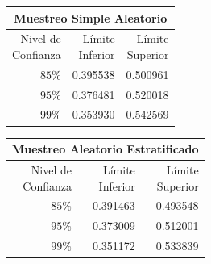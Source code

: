 \documentclass[12pt,a4paper]{article}
\begin{document}
{{            \begin{minipage}{0.5\textwidth}
                \centering
                \begin{tabular}{r|rr}
                    \multicolumn{3}{c}{Muestreo Simple Aleatorio} \\
                \midrule
                    \makecell{Nivel de\\Confianza} & \makecell{Límite\\Inferior} & \makecell{Límite\\Superior} \\
                \midrule
                    $85\%$ & 0.395538 & 0.500961 \\
                    $95\%$ & 0.376481 & 0.520018 \\
                    $99\%$ & 0.353930 & 0.542569 \\
                \bottomrule
                \end{tabular}
            \end{minipage}%
            \begin{minipage}{0.5\textwidth}
                \centering
                \begin{tabular}{r|rr}
                    \multicolumn{3}{c}{Muestreo Aleatorio Estratificado} \\
                \midrule
                    \makecell{Nivel de\\Confianza} & \makecell{Límite\\Inferior} & \makecell{Límite\\Superior} \\
                \midrule
                    $85\%$ & 0.391463 & 0.493548 \\
                    $95\%$ & 0.373009 & 0.512001 \\
                    $99\%$ & 0.351172 & 0.533839 \\
                \bottomrule
                \end{tabular}
            \end{minipage}
        }
    }

    \newpage
\end{document}
